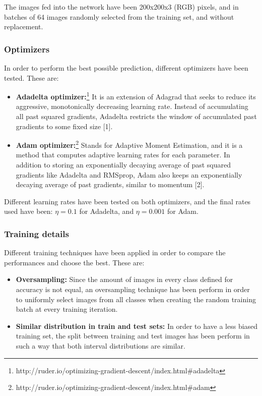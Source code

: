 \documentclass{article}
\begin{document}
The images fed into the network have been 200x200x3 (RGB) pixels, and in batches of 64 images randomly selected from the training set, and without replacement.
 
\subsubsection{Optimizers}
In order to perform the best possible prediction, different optimizers have been tested. These are:
\begin{itemize}
\item \textbf{Adadelta optimizer:}\footnote{http://ruder.io/optimizing-gradient-descent/index.html\#adadelta} It is an extension of Adagrad that seeks to reduce its aggressive, monotonically decreasing learning rate. Instead of accumulating all past squared gradients, Adadelta restricts the window of accumulated past gradients to some fixed size [1].
\item \textbf{Adam optimizer:}\footnote{http://ruder.io/optimizing-gradient-descent/index.html\#adam}
 Stands for Adaptive Moment Estimation, and it is a method that computes adaptive learning rates for each parameter. In addition to storing an exponentially decaying average of past squared gradients like Adadelta and RMSprop, Adam also keeps an exponentially decaying average of past gradients, similar to momentum [2].
\end{itemize}


Different learning rates have been tested on both optimizers, and the final rates used have been: $\eta = 0.1$ for Adadelta, and $\eta = 0.001$ for Adam.

\subsubsection{Training details}
Different training techniques have been applied in order to compare the performances and choose the best. These are:
\begin{itemize}
\item \textbf{Oversampling:} Since the amount of images in every class defined for accuracy is not equal, an oversampling technique has been perform in order to uniformly select images from all classes when creating the random training batch at every training iteration.
\item \textbf{Similar distribution in train and test sets:} In order to have a less biased training set, the split between training and test images has been perform in such a way that both interval distributions are similar.
\end{itemize}
 
\end{document}

